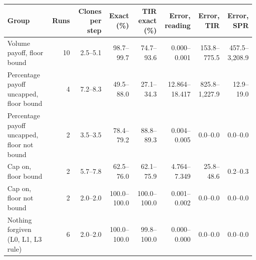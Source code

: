 \begin{tabular}{@{}lrrrrrrr@{}}
\toprule
Group & Runs & Clones per step & Exact (\%) & TIR exact (\%) & Error, reading & Error, TIR & Error, SPR \\
\midrule
Volume payoff, floor bound & 10 & 2.5--5.1 & 98.7--99.7 & 74.7--93.6 & 0.000--0.001 & 153.8--775.5 & 457.5--3{,}208.9 \\
Percentage payoff uncapped, floor bound & 4 & 7.2--8.3 & 49.5--88.0 & 27.1--34.3 & 12.864--18.417 & 825.8--1{,}227.9 & 12.9--19.0 \\
Percentage payoff uncapped, floor not bound & 2 & 3.5--3.5 & 78.4--79.2 & 88.8--89.3 & 0.004--0.005 & 0.0--0.0 & 0.0--0.0 \\
Cap on, floor bound & 2 & 5.7--7.8 & 62.5--76.0 & 62.1--75.9 & 4.764--7.349 & 25.8--48.6 & 0.2--0.3 \\
Cap on, floor not bound & 2 & 2.0--2.0 & 100.0--100.0 & 100.0--100.0 & 0.001--0.002 & 0.0--0.0 & 0.0--0.0 \\
Nothing forgiven (L0, L1, L3 rule) & 6 & 2.0--2.0 & 100.0--100.0 & 99.8--100.0 & 0.000--0.000 & 0.0--0.0 & 0.0--0.0 \\
\bottomrule
\end{tabular}
